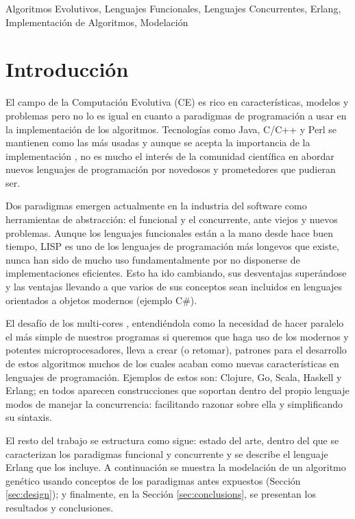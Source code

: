 \documentclass[runningheads]{llncs}
\newcommand{\keywords}[1]{\par\addvspace\baselineskip
\noindent\keywordname\enspace\ignorespaces#1}
\begin{document}
\keywords{Algoritmos Evolutivos, Lenguajes Funcionales, Lenguajes Concurrentes, Erlang, Implementación de Algoritmos, Modelación}

\section{Introducción}


\noindent El campo de la Computación Evolutiva (CE) es rico en características, modelos y problemas pero no lo es igual en cuanto a paradigmas de programación a usar en la implementación de los algoritmos. Tecnologías como Java, C/C++ y Perl se mantienen como las más usadas y aunque se acepta la importancia de la implementación \cite{DBLP:conf/iwann/MereloRACML11}, no es mucho el interés de la comunidad científica en abordar nuevos lenguajes de programación por novedosos y prometedores que pudieran ser.

Dos paradigmas emergen actualmente en la industria del software como herramientas de abstracción: el funcional y el concurrente, ante viejos y nuevos problemas. Aunque los lenguajes funcionales están a la mano desde hace buen tiempo, LISP es uno de los lenguajes de programación más longevos que existe, nunca han sido de mucho uso fundamentalmente por no disponerse de implementaciones eficientes. Esto ha ido cambiando, sus desventajas superándose y las ventajas llevando a que varios de sus conceptos sean incluidos en lenguajes orientados a objetos modernos (ejemplo C\#).

El desafío de los multi-cores \cite{SutterL05}, entendiéndola como la necesidad de hacer paralelo el más simple de nuestros programas si queremos que haga uso de los modernos y potentes microprocesadores, lleva a crear (o retomar), patrones para el desarrollo de estos algoritmos muchos de los cuales acaban como nuevas características en lenguajes de programación. Ejemplos de estos son: Clojure, Go, Scala, Haskell y Erlang; en todos aparecen construcciones que soportan dentro del propio lenguaje modos de manejar la concurrencia: facilitando razonar sobre ella y simplificando su sintaxis.

El resto del trabajo se estructura como sigue: estado del arte, dentro del que se caracterizan los paradigmas funcional y concurrente y se describe el lenguaje Erlang que los incluye. A continuación se muestra la modelación de un algoritmo genético usando conceptos de los paradigmas antes expuestos (Sección \ref{sec:design}); y finalmente, en la Sección \ref{sec:conclusions}, se presentan los resultados y conclusiones.
\end{document}
